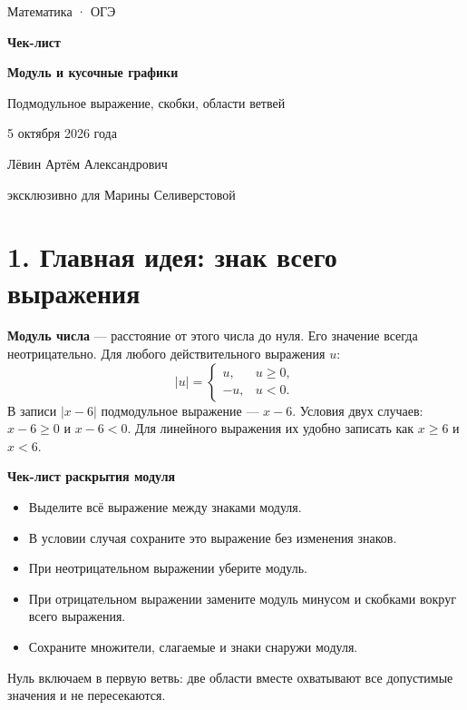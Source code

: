 \documentclass[a4paper,12pt]{article}
\newcommand{\topic}[1]{\section*{\color{darkaccent}#1}}
\newcommand{\key}[1]{\textbf{\color{darkaccent}#1}}
\begin{document}
\thispagestyle{empty}
\begin{center}
\vspace*{22mm}
{\Large\color{textgray}Математика · ОГЭ}\par
\vspace{11mm}
{\Huge\bfseries\color{darkaccent}Чек-лист}\par
\vspace{8mm}
{\LARGE\bfseries Модуль и кусочные графики}\par
\vspace{10mm}
{\large Подмодульное выражение, скобки, области ветвей}\par
\vspace{12mm}
{\large 5 октября 2026 года}\par
\vfill
{\large Лёвин Артём Александрович}\par
{\large эксклюзивно для Марины Селиверстовой}\par
\vspace{15mm}
\vspace{8mm}
\end{center}
\clearpage
\topic{1. Главная идея: знак всего выражения}
\key{Модуль числа} — расстояние от этого числа до нуля. Его значение всегда неотрицательно. Для любого действительного выражения $u$:
\[
|u|=\begin{cases}u,&u\ge0,\\-u,&u<0.\end{cases}
\]
В записи $|x-6|$ подмодульное выражение — $x-6$. Условия двух случаев: $x-6\ge0$ и $x-6<0$. Для линейного выражения их удобно записать как $x\ge6$ и $x<6$.

\key{Чек-лист раскрытия модуля}
\begin{itemize}
\item Выделите всё выражение между знаками модуля.
\item В условии случая сохраните это выражение без изменения знаков.
\item При неотрицательном выражении уберите модуль.
\item При отрицательном выражении замените модуль минусом и скобками вокруг всего выражения.
\item Сохраните множители, слагаемые и знаки снаружи модуля.
\end{itemize}
Нуль включаем в первую ветвь: две области вместе охватывают все допустимые значения и не пересекаются.
\end{document}

